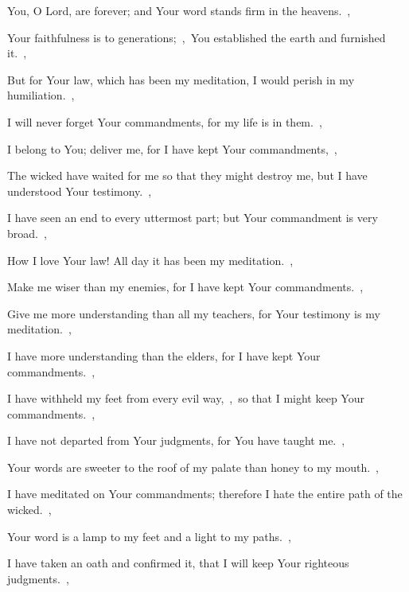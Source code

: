 \documentclass[12pt,twoside,a5paper]{article}
\begin{document}
\begin{normalparskip}
   You, O Lord, are forever; and Your word stands firm in the heavens.~\sep


  Your faithfulness is to generations;~\sep\ You established the earth and furnished it.~\sep

  But for Your law, which has been my meditation, I would perish in my humiliation.~\sep

  I will never forget Your commandments, for my life is in them.~\sep

  I belong to You; deliver me, for I have kept Your commandments,~\sep

  The wicked have waited for me so that they might destroy me, but I have understood Your testimony.~\sep

  I have seen an end to every uttermost part; but Your commandment is very broad.~\sep

   How I love Your law! All day it has been my meditation.~\sep


  Make me wiser than my enemies, for I have kept Your commandments.~\sep

  Give me more understanding than all my teachers, for Your testimony is my meditation.~\sep

  I have more understanding than the elders, for I have kept Your commandments.~\sep

  I have withheld my feet from every evil way,~\sep\ so that I might keep Your commandments.~\sep

  I have not departed from Your judgments, for You have taught me.~\sep

  Your words are sweeter to the roof of my palate than honey to my mouth.~\sep

  I have meditated on Your commandments; therefore I hate the entire path of the wicked.~\sep

   Your word is a lamp to my feet and a light to my paths.~\sep


  I have taken an oath and confirmed it, that I will keep Your righteous judgments.~\sep


\end{normalparskip}
\end{document}

